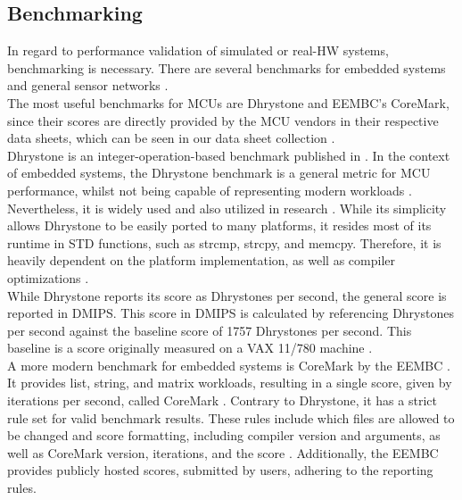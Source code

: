 \documentclass[english]{tudscrartcl}
\begin{document}
		\subsection{Benchmarking}
			\label{sec:bg_benchmk}
			In regard to performance validation of simulated or real-\ac{HW} systems, benchmarking is necessary.
			There are several benchmarks for embedded systems \cite{weiss2002dhrystone, EEMBC-WebSite} and general sensor networks \cite{8802949, CHEN2022100091, 8809492}.
			\\
			The most useful benchmarks for \acp{MCU} are Dhrystone and EEMBC's CoreMark, since their scores are directly provided by the \ac{MCU} vendors in their respective data sheets, which can be seen in our data sheet collection \cite{ACAE-REPO}.
			\\
			Dhrystone is an integer-operation-based benchmark published in \citeyear{10.1145/358274.358283} \cite{10.1145/358274.358283}.
			In the context of embedded systems, the Dhrystone benchmark is a general metric for \ac{MCU} performance, whilst not being capable of representing modern workloads \cite{weiss2002dhrystone}.
			Nevertheless, it is widely used and also utilized in research \cite{10131693}.
			While its simplicity allows Dhrystone to be easily ported to many platforms, it resides most of its runtime in \ac{STD} functions, such as strcmp, strcpy, and memcpy.
			Therefore, it is heavily dependent on the platform implementation, as well as compiler optimizations \cite{weiss2002dhrystone}.
			\\
			While Dhrystone reports its score as Dhrystones per second, the general score is reported in \ac{DMIPS}.
			This score in \ac{DMIPS} is calculated by referencing Dhrystones per second against the baseline score of 1757 Dhrystones per second.
			This baseline is a score originally measured on a VAX 11/780 machine \cite{weiss2002dhrystone}.
			\\
			A more modern benchmark for embedded systems is CoreMark by the \ac{EEMBC} \cite{EEMBC-WebSite}.
			It provides list, string, and matrix workloads, resulting in a single score, given by iterations per second, called CoreMark \cite{gal2012exploring}.
			Contrary to Dhrystone, it has a strict rule set for valid benchmark results.
			These rules include which files are allowed to be changed and score formatting, including compiler version and arguments, as well as CoreMark version, iterations, and the score \cite{EEMBC-WebSite}.
			Additionally, the \ac{EEMBC} provides publicly hosted scores, submitted by users, adhering to the reporting rules.
\end{document}
